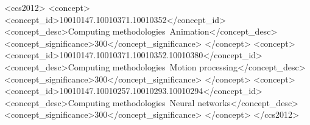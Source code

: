\documentclass[sigconf,anonymous,review]{acmart}
\begin{document}
%
%
\begin{CCSXML}
<ccs2012>
  <concept>
    <concept_id>10010147.10010371.10010352</concept_id>
    <concept_desc>Computing methodologies~Animation</concept_desc>
    <concept_significance>300</concept_significance>
  </concept>
  <concept>
    <concept_id>10010147.10010371.10010352.10010380</concept_id>
    <concept_desc>Computing methodologies~Motion processing</concept_desc>
    <concept_significance>300</concept_significance>
  </concept>
  <concept>
    <concept_id>10010147.10010257.10010293.10010294</concept_id>
    <concept_desc>Computing methodologies~Neural networks</concept_desc>
    <concept_significance>300</concept_significance>
  </concept>
</ccs2012>
\end{CCSXML}



\maketitle


\end{document}
